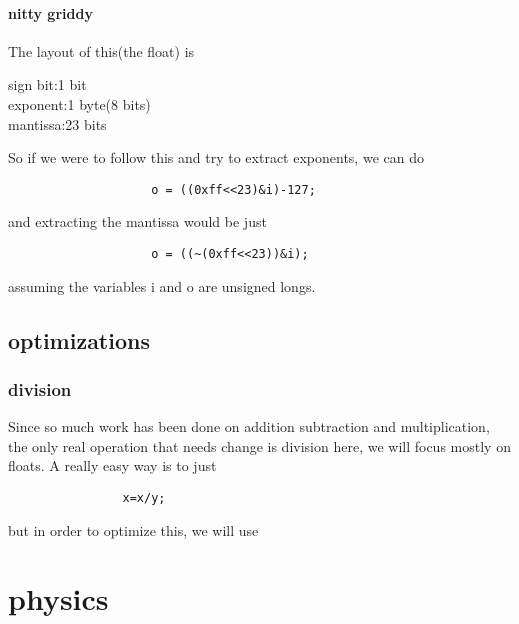 \documentclass{article} %
\begin{document}
            \paragraph{nitty griddy}
                The layout of this(the float) is 
                \begin{center}
                    sign bit:1 bit\\
                    exponent:1 byte(8 bits)\\
                    mantissa:23 bits\\
                \end{center}
                So if we were to follow this and try to extract exponents, we can do
                \begin{verbatim}
                    o = ((0xff<<23)&i)-127;
                \end{verbatim}
                and extracting the mantissa would be just 
                \begin{verbatim}
                    o = ((~(0xff<<23))&i);
                \end{verbatim}
                assuming the variables i and o are unsigned longs.
    \subsection{optimizations}
        \subsubsection{division}
            Since so much work has been done on addition subtraction and multiplication, the only real operation that needs change is division
            here, we will focus mostly on floats. A really easy way is to just \begin{verbatim}
                x=x/y;
            \end{verbatim}
            but in order to optimize this, we will use 
\section{physics}
\end{document}

